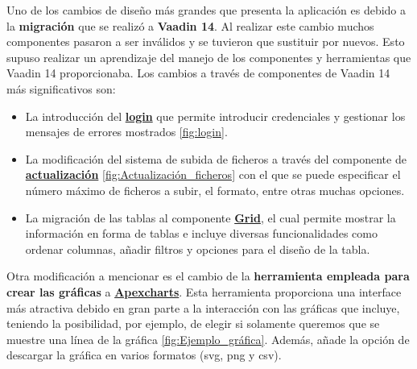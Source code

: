 Uno de los cambios de diseño más grandes que presenta la aplicación es debido a la \textbf{migración} que se realizó a \textbf{Vaadin 14}. Al realizar este cambio muchos componentes pasaron a ser inválidos y se tuvieron que sustituir por nuevos. Esto supuso realizar un aprendizaje del manejo de los componentes y herramientas que Vaadin 14 proporcionaba.
Los cambios a través de componentes de Vaadin 14 más significativos son:
\begin{itemize}
	\tightlist
	\item La introducción del \textbf{\href{https://vaadin.com/components/vaadin-login}{login}} que permite introducir credenciales y gestionar los mensajes de errores mostrados \ref{fig:login}. 
	
	
	\item La modificación del sistema de subida de ficheros a través del componente de \textbf{\href{https://vaadin.com/components/vaadin-upload}{actualización}} \ref{fig:Actualización_ficheros} con el que se puede especificar el número máximo de ficheros a subir, el formato, entre otras muchas opciones. 
	
	
	\item La migración de las tablas al componente \textbf{\href{https://vaadin.com/docs/v14/flow/components/tutorial-flow-grid}{Grid}}, el cual permite mostrar la información en forma de tablas e incluye diversas funcionalidades como ordenar columnas, añadir filtros y opciones para el diseño de la tabla.  	
\end{itemize}

Otra modificación a mencionar es el cambio de la \textbf{herramienta empleada para crear las gráficas} a\textbf{ \href{https://apexcharts.com/}{Apexcharts}}.
Esta herramienta proporciona una interface más atractiva debido en gran parte a la interacción con las gráficas que incluye, teniendo la posibilidad, por ejemplo, de elegir si solamente queremos que se muestre una línea de la gráfica \ref{fig:Ejemplo_gráfica}. 
Además, añade la opción de descargar la gráfica en varios formatos (svg, png y csv). 

